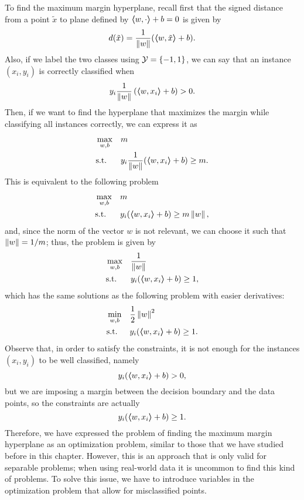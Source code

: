 To find the maximum margin hyperplane, recall first that the signed distance from a point $\tilde{x}$ to plane defined by $\bm{\left\langle} w, \cdot \bm{\right\rangle} + b = 0$ is given by 
\begin{equation}
    \nonumber
    d(\tilde{x}) = \frac{1}{\left\lVert w\right\rVert} (\bm{\left\langle} w, \tilde{x} \bm{\right\rangle} + b) .
\end{equation}
Also, if we label the two classes using $\mathcal{Y} = \left\{-1, 1\right\}$, we can say that an instance $(x_i, y_i)$ is correctly classified when $$y_i \frac{1}{\left\lVert w\right\rVert} \left(\bm{\left\langle} w, x_i \bm{\right\rangle} + b \right) > 0 .$$
Then, if we want to find the hyperplane that maximizes the margin while classifying all instances correctly, we can express it as
\begin{equation}\nonumber
    \begin{aligned}
        &\max_{w, b} & & m \\
        & \text{s.t.} & & y_i \frac{1}{\left\lVert w\right\rVert} (\bm{\left\langle} w, x_i \bm{\right\rangle} + b) \geq m .         
    \end{aligned}  
\end{equation}
This is equivalent to the following problem 
\begin{equation}\nonumber
    \begin{aligned}
        &\max_{w, b} & & m \\
        & \text{s.t.} & & y_i (\bm{\left\langle} w, x_i \bm{\right\rangle} + b) \geq m \left\lVert w\right\rVert ,       
    \end{aligned}  
\end{equation}
and, since the norm of the vector $w$ is not relevant, we can choose it such that $\left\lVert w\right\rVert = 1 / m$; thus, the problem is given by
\begin{equation}\nonumber
    \begin{aligned}
        &\max_{w, b} & & \frac{1}{\left\lVert w\right\rVert} \\
        & \text{s.t.} & & y_i (\bm{\left\langle} w, x_i \bm{\right\rangle} + b) \geq 1 ,       
    \end{aligned}  
\end{equation}
which has the same solutions as the following problem with easier derivatives:
\begin{equation}
    \label{eq:separable_primal}
    \begin{aligned}
        &\min_{w, b} & & \frac{1}{2} \norm{w}^2 \\
        & \text{s.t.} & & y_i (\dotp{w}{x_i} + b) \geq 1 .       
    \end{aligned}  
\end{equation}
%
Observe that, in order to satisfy the constraints, it is not enough for the instances $(x_i, y_i)$ to be well classified, namely 
$$ y_i (\bm{\left\langle} w, x_i \bm{\right\rangle} + b) > 0 ,$$
but we are imposing a margin between the decision boundary and the data points, so the constraints are actually 
$$ y_i (\bm{\left\langle} w, x_i \bm{\right\rangle} + b) \geq 1 .$$
Therefore, we have expressed the problem of finding the maximum margin hyperplane as an optimization problem, similar to those that we have studied before in this chapter. However, this is an approach that is only valid for separable problems; when using real-world data it is uncommon to find this kind of problems. To solve this issue, we have to introduce variables in the optimization problem that allow for misclassified points.

